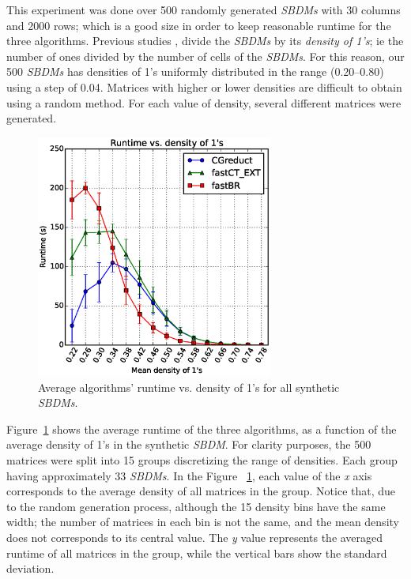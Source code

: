\documentclass[authoryear,preprint,review,12pt]{elsarticle}
\begin{document}
	This experiment was done over 500 randomly generated \textit{SBDMs} with 30 columns and 2000 rows; which is a good size in order to keep reasonable runtime for the three algorithms. Previous studies \citep{Rojas12,Lias13,Rodriguez15}, divide the \textit{SBDMs} by its \emph{density of 1's}; ie the number of ones divided by the number of cells of the \textit{SBDMs}. For this reason, our 500 \textit{SBDMs} has densities of 1's uniformly distributed in the range (0.20--0.80) using a step of 0.04. Matrices with higher or lower densities are difficult to obtain using a random method. For each value of density, several different matrices were generated. 
				
	\begin{figure}[htb]
		\begin{center}
			\includegraphics[height=8cm]{overal.eps}
		\end{center}
		\caption{Average algorithms' runtime vs. density of 1's for all synthetic \textit{SBDMs}.}
		\label{fig:scattDensity}
	\end{figure}	

	Figure~\ref{fig:scattDensity} shows the average runtime of the three algorithms, as a function of 
	the average density of 1's in the synthetic \textit{SBDM}. For clarity purposes, the 500 matrices were split into 15 groups discretizing the range of densities. Each group having approximately 33 \textit{SBDMs}. In the Figure ~\ref{fig:scattDensity}, each  value of the \textit{x} axis corresponds to the average density of all matrices in the group. Notice that, due to the random generation process, although the 15 density bins have the same width; the number of matrices in each bin is not the same, and the mean density does not corresponds to its central value. The \textit{y} value represents the averaged runtime of all matrices in the group, while the vertical bars show the standard deviation. 
	
\end{document}
